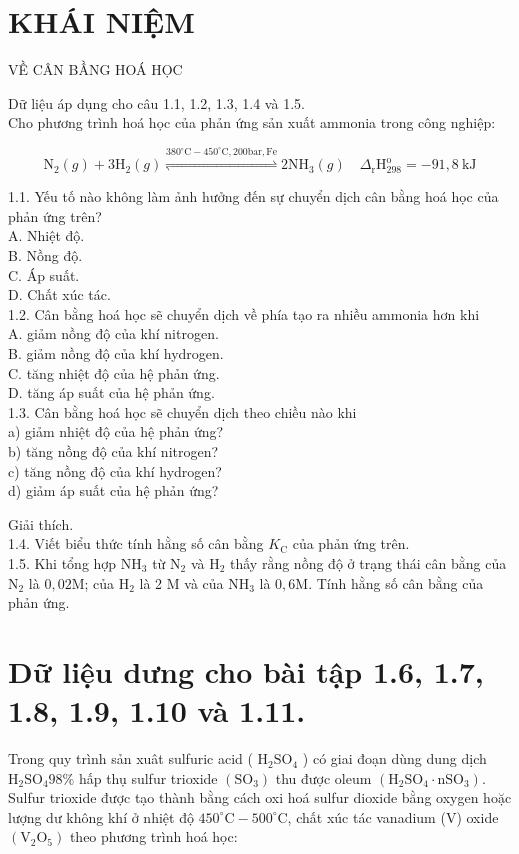 \documentclass[10pt]{article}
\begin{document}
\section*{KHÁI NIỆM}
VỀ CÂN BẦNG HOÁ HỌC

Dữ liệu áp dụng cho câu 1.1, 1.2, 1.3, 1.4 và 1.5.\\
Cho phương trình hoá học của phản ứng sản xuất ammonia trong công nghiệp:

$$
\mathrm{N}_{2}(g)+3 \mathrm{H}_{2}(g) \stackrel{380^{\circ} \mathrm{C}-450^{\circ} \mathrm{C}, 200 \mathrm{bar}, \mathrm{Fe}}{\rightleftharpoons} 2 \mathrm{NH}_{3}(g) \quad \Delta_{\mathrm{r}} \mathrm{H}_{298}^{\mathrm{o}}=-91,8 \mathrm{~kJ}
$$

1.1. Yếu tố nào không làm ảnh hưởng đến sự chuyển dịch cân bằng hoá học của phản ứng trên?\\
A. Nhiệt độ.\\
B. Nồng độ.\\
C. Áp suất.\\
D. Chất xúc tác.\\
1.2. Cân bằng hoá học sẽ chuyển dịch về phía tạo ra nhiều ammonia hơn khi\\
A. giảm nồng độ của khí nitrogen.\\
B. giảm nồng độ của khí hydrogen.\\
C. tăng nhiệt độ của hệ phản ứng.\\
D. tăng áp suất của hệ phản ứng.\\
1.3. Cân bằng hoá học sẽ chuyển dịch theo chiều nào khi\\
a) giảm nhiệt độ của hệ phản ứng?\\
b) tăng nồng độ của khí nitrogen?\\
c) tăng nồng độ của khí hydrogen?\\
d) giảm áp suất của hệ phản ứng?

Giải thích.\\
1.4. Viết biểu thức tính hằng số cân bằng $K_{\mathrm{C}}$ của phản ứng trên.\\
1.5. Khi tổng hợp $\mathrm{NH}_{3}$ từ $\mathrm{N}_{2}$ và $\mathrm{H}_{2}$ thấy rằng nồng độ ở trạng thái cân bằng của $\mathrm{N}_{2}$ là $0,02 \mathrm{M}$; của $\mathrm{H}_{2}$ là 2 M và của $\mathrm{NH}_{3}$ là $0,6 \mathrm{M}$. Tính hằng số cân bằng của phản ứng.

\section*{Dữ liệu dưng cho bài tập 1.6, 1.7, 1.8, 1.9, 1.10 và 1.11.}
Trong quy trình sản xuât sulfuric acid ( $\mathrm{H}_{2} \mathrm{SO}_{4}$ ) có giai đoạn dùng dung dịch $\mathrm{H}_{2} \mathrm{SO}_{4} 98 \%$ hấp thụ sulfur trioxide $\left(\mathrm{SO}_{3}\right)$ thu được oleum $\left(\mathrm{H}_{2} \mathrm{SO}_{4} \cdot \mathrm{nSO}_{3}\right)$. Sulfur trioxide được tạo thành bằng cách oxi hoá sulfur dioxide bằng oxygen hoặc lượng dư không khí ở nhiệt độ $450^{\circ} \mathrm{C}-500^{\circ} \mathrm{C}$, chất xúc tác vanadium (V) oxide $\left(\mathrm{V}_{2} \mathrm{O}_{5}\right)$ theo phương trình hoá học:
\end{document}
